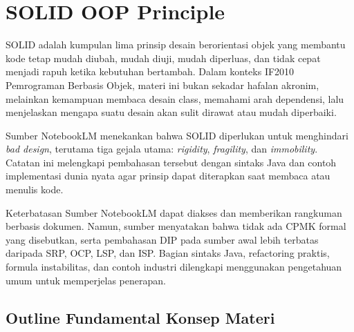 \section{SOLID OOP Principle}

SOLID adalah kumpulan lima prinsip desain berorientasi objek yang membantu kode tetap mudah diubah, mudah diuji, mudah diperluas, dan tidak cepat menjadi rapuh ketika kebutuhan bertambah. Dalam konteks IF2010 Pemrograman Berbasis Objek, materi ini bukan sekadar hafalan akronim, melainkan kemampuan membaca desain class, memahami arah dependensi, lalu menjelaskan mengapa suatu desain akan sulit dirawat atau mudah diperbaiki.

Sumber NotebookLM menekankan bahwa SOLID diperlukan untuk menghindari \textit{bad design}, terutama tiga gejala utama: \textit{rigidity}, \textit{fragility}, dan \textit{immobility}. Catatan ini melengkapi pembahasan tersebut dengan sintaks Java dan contoh implementasi dunia nyata agar prinsip dapat diterapkan saat membaca atau menulis kode.

\begin{cmt}{Keterbatasan Sumber}{}
NotebookLM dapat diakses dan memberikan rangkuman berbasis dokumen. Namun, sumber menyatakan bahwa tidak ada CPMK formal yang disebutkan, serta pembahasan DIP pada sumber awal lebih terbatas daripada SRP, OCP, LSP, dan ISP. Bagian sintaks Java, refactoring praktis, formula instabilitas, dan contoh industri dilengkapi menggunakan pengetahuan umum untuk memperjelas penerapan.
\end{cmt}

\subsection{Outline Fundamental Konsep Materi}

